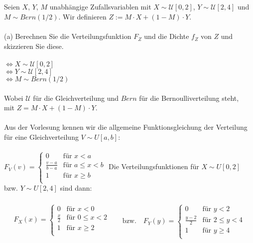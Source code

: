 \documentclass[a4paper]{article}
\begin{document}
\subsection{}
Seien $X$, $Y$, $M$ unabhängige Zufallsvariablen mit $X \sim \mathcal{U}[0, 2]$, $Y \sim\mathcal{U}[2, 4]$ und $M\sim Bern(1/2)$.
Wir definieren $Z := M\cdot X + (1-M )\cdot Y$.\\\\
(a) Berechnen Sie die Verteilungsfunktion $F_Z$ und die Dichte $f_Z$ von $Z$ und skizzieren Sie diese.\\\\
$\Leftrightarrow X \sim \mathcal{U}[0,2]$\\
$\Leftrightarrow Y \sim \mathcal{U}[2,4]$\\
$\Leftrightarrow M \sim Bern(1/2)$\\\\
Wobei $\mathcal{U}$ für die Gleichverteilung und $Bern$ für die Bernoulliverteilung steht,\\
mit $Z = M \cdot X + (1 - M) \cdot Y$.\\\\
Aus der Vorlesung kennen wir die allgemeine Funktionsgleichung der Verteilung für eine Gleichverteilung $V \sim U[a,b]$:\\\\
\(F_V(v)=\begin{cases}
        0 & \text{für } x<a\\
        \frac{v - a}{b-a} & \text{für } a \leq x < b\\
        1 & \text{für } x \geq b\\
\end{cases}\)
\clearpage
\noindent Die Verteilungsfunktionen für $X \sim U[0,2]$ bzw. $Y \sim U[2,4]$ sind dann:\\\\
\[
\begin{array}{c}
F_X(x) = \begin{cases}
        0 & \text{für } x < 0 \\
        \frac{x}{2} & \text{für } 0 \leq x < 2 \\
        1 & \text{für } x \geq 2 \\
\end{cases} \\
\end{array}
\quad
\begin{array}{c}
\text{bzw.} \quad
F_Y(y) = \begin{cases}
        0 & \text{für } y < 2 \\
        \frac{y - 2}{2} & \text{für } 2 \leq y < 4 \\
        1 & \text{für } y \geq 4 \\
\end{cases}
\end{array}
\]\\
\end{document}
